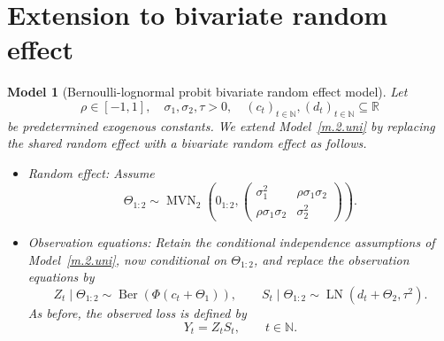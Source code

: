 \documentclass[11pt,authoryear]{elsarticle}
\def\Real{\mathbb{R}}
\newtheorem{model}{Model}
\theoremstyle{nopunct}
\numberwithin{equation}{section}
\begin{document}
\section{Extension to bivariate random effect}




































































\begin{model}[Bernoulli-lognormal probit bivariate random effect model]
\label{model.2}
Let
\[
\rho\in[-1,1], \quad 
\sigma_1, \sigma_2, \tau>0, \quad 
(c_t)_{t\in\mathbb N},(d_t)_{t\in\mathbb N}\subseteq\Real
\]
be predetermined exogenous constants.
We extend Model~\ref{m.2.uni} by replacing the shared random
effect with a bivariate random effect as follows.

\begin{itemize}
  \item[i.] Random effect:
  Assume
  \[
  \Theta_{1:2}
  \sim
  \operatorname{MVN}_2
  \left(
  0_{1:2},
  \begin{pmatrix}
  \sigma_1^2 & \rho\sigma_1\sigma_2\\
  \rho\sigma_1\sigma_2 & \sigma_2^2
  \end{pmatrix}
  \right).
  \]

  \item[ii.] Observation equations:
  Retain the conditional independence assumptions of
  Model~\ref{m.2.uni}, now conditional on \(\Theta_{1:2}\),
  and replace the observation equations by
  \[
  Z_t\mid\Theta_{1:2}
  \sim
  \operatorname{Ber}\left(\Phi(c_t+\Theta_1)\right),
  \qquad
  S_t\mid\Theta_{1:2}
  \sim
  \operatorname{LN}(d_t+\Theta_2,\tau^2).
  \]
  As before, the observed loss is defined by
  \[
  Y_t=Z_tS_t,
  \qquad t\in\mathbb N.
  \]
\end{itemize}
\end{model}
\end{document}
